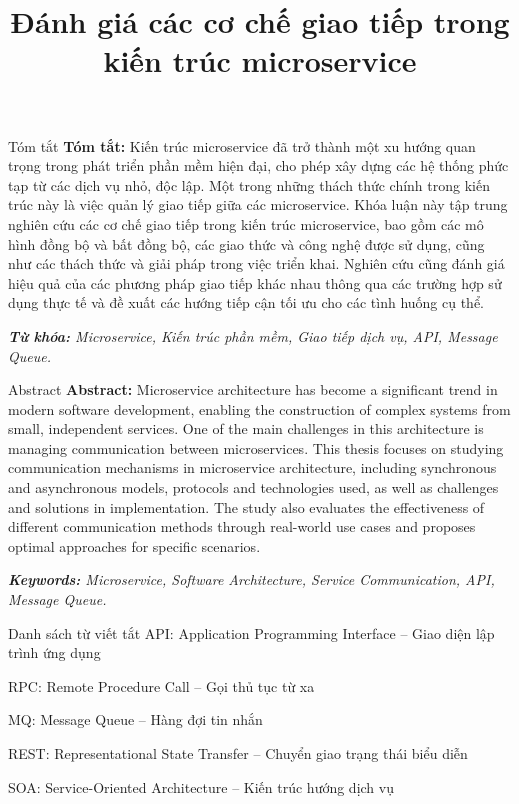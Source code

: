 \documentclass{uetgraduation}
\title{Đánh giá các cơ chế giao tiếp trong kiến trúc microservice}
\begin{document}
\makecovers

\begin{preamble}{Tóm tắt}
    \textbf{Tóm tắt:} Kiến trúc microservice đã trở thành một xu hướng quan trọng trong phát triển phần mềm hiện đại, cho phép xây dựng các hệ thống phức tạp từ các dịch vụ nhỏ, độc lập. Một trong những thách thức chính trong kiến trúc này là việc quản lý giao tiếp giữa các microservice. Khóa luận này tập trung nghiên cứu các cơ chế giao tiếp trong kiến trúc microservice, bao gồm các mô hình đồng bộ và bất đồng bộ, các giao thức và công nghệ được sử dụng, cũng như các thách thức và giải pháp trong việc triển khai. Nghiên cứu cũng đánh giá hiệu quả của các phương pháp giao tiếp khác nhau thông qua các trường hợp sử dụng thực tế và đề xuất các hướng tiếp cận tối ưu cho các tình huống cụ thể.

    \textit{\textbf{Từ khóa:} Microservice, Kiến trúc phần mềm, Giao tiếp dịch vụ, API, Message Queue.}
\end{preamble}

\begin{preamble}{Abstract}
    \textbf{Abstract:} Microservice architecture has become a significant trend in modern software development, enabling the construction of complex systems from small, independent services. One of the main challenges in this architecture is managing communication between microservices. This thesis focuses on studying communication mechanisms in microservice architecture, including synchronous and asynchronous models, protocols and technologies used, as well as challenges and solutions in implementation. The study also evaluates the effectiveness of different communication methods through real-world use cases and proposes optimal approaches for specific scenarios.

    \textit{\textbf{Keywords:} Microservice, Software Architecture, Service Communication, API, Message Queue.}
\end{preamble}

\begin{contentlisting}
    \tableofcontents
    \listoffigures
    \listoftables

    \begin{contentlistingsection}{Danh sách từ viết tắt}
        API: Application Programming Interface -- Giao diện lập trình ứng dụng

        RPC: Remote Procedure Call -- Gọi thủ tục từ xa

        MQ: Message Queue -- Hàng đợi tin nhắn

        REST: Representational State Transfer -- Chuyển giao trạng thái biểu diễn

        SOA: Service-Oriented Architecture -- Kiến trúc hướng dịch vụ
    \end{contentlistingsection}
\end{contentlisting}
\end{document}
